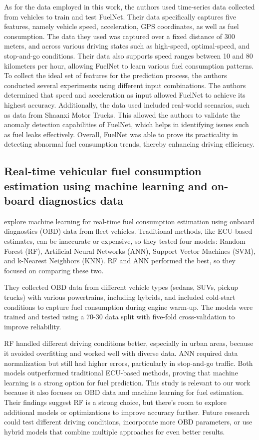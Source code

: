 \documentclass[letterpaper]{article}
\begin{document}
As for the data employed in this work, the authors used time-series data collected
from vehicles to train and test FuelNet. Their data specifically captures five
features, namely vehicle speed, acceleration, GPS coordinates, as well as fuel
consumption. The data they used was captured over a fixed distance of 300 meters,
and across various driving states such as high-speed, optimal-speed, and
stop-and-go conditions. Their data also supports speed ranges between 10 and 80
kilometers per hour, allowing FuelNet to learn various fuel consumption patterns.
To collect the ideal set of features for the prediction process, the authors
conducted several experiments using different input combinations. The authors
determined that speed and acceleration as input allowed FuelNet to achieve its
highest accuracy. Additionally, the data used included real-world scenarios,
such as data from Shaanxi Motor Trucks. This allowed the authors to validate the
anomaly detection capabilities of FuelNet, which helps in identifying issues
such as fuel leaks effectively. Overall, FuelNet was able to prove its
practicality in detecting abnormal fuel consumption trends, thereby enhancing
driving efficiency.

\subsection*{Real-time vehicular fuel consumption estimation using machine
learning and on-board diagnostics data}

\cite{abediasl2024real} explore machine learning for real-time fuel consumption estimation
using onboard diagnostics (OBD) data from fleet vehicles. Traditional methods,
like ECU-based estimates, can be inaccurate or expensive, so they tested four
models: Random Forest (RF), Artificial Neural Networks (ANN), Support Vector
Machines (SVM), and k-Nearest Neighbors (KNN). RF and ANN performed the best, so
they focused on comparing these two. 

They collected OBD data from different
vehicle types (sedans, SUVs, pickup trucks) with various powertrains, including
hybrids, and included cold-start conditions to capture fuel consumption during
engine warm-up. The models were trained and tested using a 70-30 data split with
five-fold cross-validation to improve reliability. 

RF handled different driving
conditions better, especially in urban areas, because it avoided overfitting and
worked well with diverse data. ANN required data normalization but still had
higher errors, particularly in stop-and-go traffic. Both models outperformed
traditional ECU-based methods, proving that machine learning is a strong option
for fuel prediction. This study is relevant to our work because it also focuses
on OBD data and machine learning for fuel estimation. Their findings suggest RF
is a strong choice, but there's room to explore additional models or
optimizations to improve accuracy further. Future research could test different
driving conditions, incorporate more OBD parameters, or use hybrid models that
combine multiple approaches for even better results.
\end{document}
